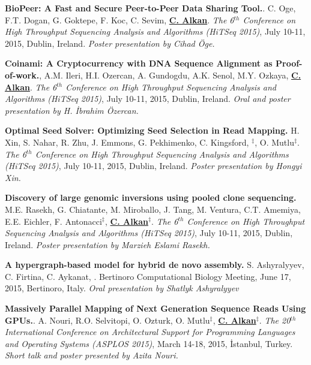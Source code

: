 \vspace{-.2cm}
 {\bf BioPeer: A Fast and Secure Peer-to-Peer Data Sharing Tool.}.
  C. Oge, F.T. Dogan, G. Goktepe, F. Koc, C. Sevim, {\bf {\underline{C. Alkan}}}.
{\em The 6$^{th}$ Conference on High Throughput Sequencing Analysis and Algorithms (HiTSeq 2015)}, 
July 10-11, 2015, Dublin, Ireland. {\it Poster presentation by Cihad Öge.}

\vspace{-.2cm}
 {\bf Coinami: A Cryptocurrency with DNA Sequence Alignment as Proof-of-work.},
  A.M. Ileri, H.I. Ozercan, A. Gundogdu, A.K. Senol, M.Y. Ozkaya, {\bf {\underline{C. Alkan}}}.
{\em The 6$^{th}$ Conference on High Throughput Sequencing Analysis and Algorithms (HiTSeq 2015)}, 
July 10-11, 2015, Dublin, Ireland. {\it Oral and poster presentation by H. İbrahim Özercan.}



\vspace{-.2cm}        
       {\bf Optimal Seed Solver: Optimizing Seed Selection in Read Mapping.}
       H. Xin, S. Nahar, R. Zhu, J. Emmons, G. Pekhimenko, C. Kingsford, \calkan{}$^\ddag$, O. Mutlu$^\ddag$.
{\em The 6$^{th}$ Conference on High Throughput Sequencing Analysis and Algorithms (HiTSeq 2015)}, 
July 10-11, 2015, Dublin, Ireland. {\it Poster presentation by Hongyi Xin.}

\vspace{-.2cm}
{\bf Discovery of large genomic inversions using pooled clone sequencing.}
M.E. Rasekh, G. Chiatante, M. Miroballo, J. Tang, M. Ventura, C.T. Amemiya, E.E. Eichler, F. Antonacci$^\ddag$, {\bf {\underline{C. Alkan}}}$^\ddag$.
{\em The 6$^{th}$ Conference on High Throughput Sequencing Analysis and Algorithms (HiTSeq 2015)}, 
July 10-11, 2015, Dublin, Ireland. {\it Poster presentation by Marzieh Eslami Rasekh.}


\vspace{-.2cm}
  {\bf  A hypergraph-based model for hybrid de novo assembly.}
  S. Ashyralyyev, C. Firtina, C. Aykanat, \calkan{}.
  Bertinoro Computational Biology Meeting, June 17, 2015, Bertinoro, Italy. {\it Oral presentation by Shatlyk Ashyralyyev}

\vspace{-.2cm}
 {\bf Massively Parallel Mapping of Next Generation Sequence Reads Using GPUs.}.
  A. Nouri, R.O. Selvitopi, O. Ozturk, O. Mutlu$^\ddag$, {\bf {\underline{C. Alkan}}}$^\ddag$.
{\em The 20$^{th}$ International Conference on Architectural Support for Programming Languages and Operating Systems (ASPLOS 2015)}, 
March 14-18, 2015, İstanbul, Turkey. {\it Short talk and poster presented by Azita Nouri.}


